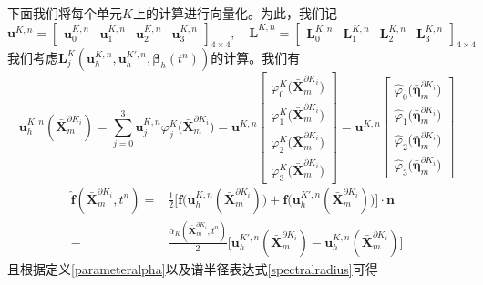 \documentclass[a4paper, 12pt, UTF8]{ctexart}
\newcommand{\bs}[1]{\boldsymbol{#1}}
\begin{document}
下面我们将每个单元$K$上的计算进行向量化。为此，我们记
\begin{equation}
\bs u^{K,n}=\begin{bmatrix}
\bs u_0^{K,n} & \bs u_1^{K,n} & \bs u_2^{K,n} & \bs u_3^{K,n}
\end{bmatrix}_{4\times 4},\quad \bs L^{K,n}=\begin{bmatrix}
\bs L_0^{K,n} &\bs L_1^{K,n} & \bs L_2^{K,n} & \bs L_3^{K,n}
\end{bmatrix}_{4\times 4}
\end{equation}
我们考虑$\bs L_{j}^K\left(\bs u_{h}^{K, n}, \bs u_{h}^{K', n},\bs \beta_{h}\left(t^{n}\right)\right)$的计算。我们有
\begin{equation}
\bs u_{h}^{K,n}\left(\bar{\bs{X}}_{m}^{\partial K_i}\right)=\sum\limits_{j=0}^3\bs u_j^{K,n}\varphi_j^K\big(\bar{\bs{X}}_{m}^{\partial K_i}\big)=\bs u^{K,n}\begin{bmatrix}
\varphi_0^K\big(\bar{\bs{X}}_{m}^{\partial K_i}\big)\\
\varphi_1^K\big(\bar{\bs{X}}_{m}^{\partial K_i}\big)\\
\varphi_2^K\big(\bar{\bs{X}}_{m}^{\partial K_i}\big)\\
\varphi_3^K\big(\bar{\bs{X}}_{m}^{\partial K_i}\big)
\end{bmatrix}=\bs u^{K,n}\begin{bmatrix}
\hat{\varphi}_0\big(\bar{\bs{\eta}}_{m}^{\partial K_i}\big)\\
\hat{\varphi}_1\big(\bar{\bs{\eta}}_{m}^{\partial K_i}\big)\\
\hat{\varphi}_2\big(\bar{\bs{\eta}}_{m}^{\partial K_i}\big)\\
\hat{\varphi}_3\big(\bar{\bs{\eta}}_{m}^{\partial K_i}\big)
\end{bmatrix}
\end{equation}
\begin{equation}
\begin{split}
\hat{\bs f}\left(\bar{\bs{X}}_{m}^{\partial K_i}, t^n\right)=&\frac{1}{2}\Big[\bs f\big({\bs u_{h}^{K,n}\left(\bar{\bs{X}}_{m}^{\partial K_i}\right)}\big)+\bs f\big({\bs u_{h}^{K',n}\left(\bar{\bs{X}}_{m}^{\partial K_i}\right)}\big) \Big]\cdot \bs{n}\\
-&\frac{\alpha_{K}(\bar{\bs{X}}_{m}^{\partial K_i}, t^n)}{2}\Big[{\bs u_{h}^{K',n}\left(\bar{\bs{X}}_{m}^{\partial K_i}\right)}-{\bs u_{h}^{K,n}\left(\bar{\bs{X}}_{m}^{\partial K_i}\right)}\Big]
\end{split}
\end{equation}
且根据定义\eqref{parameteralpha}以及谱半径表达式\eqref{spectralradius}可得
\end{document}

